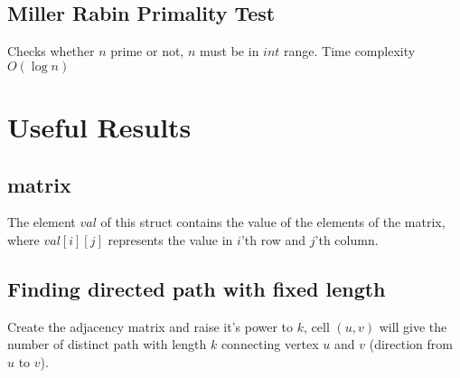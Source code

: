 \documentclass[8pt, a4paper, twocolumn]{article}
\begin{document}
\subsection{Miller Rabin Primality Test}
Checks whether $n$ prime or not, $n$ must be in $int$ range. Time complexity $O(\log n)$


\section{Useful Results}

\subsection{matrix}
The element $val$ of this struct contains the value of the elements of the matrix, where $val[i][j]$ represents the value in $i$'th row and $j$'th column.



\subsection{Finding directed path with fixed length}
Create the adjacency matrix and raise it's power to $k$, cell $(u,v)$ will give the number of distinct path with length $k$ connecting vertex $u$ and $v$ (direction from $u$ to $v$).
\end{document}
